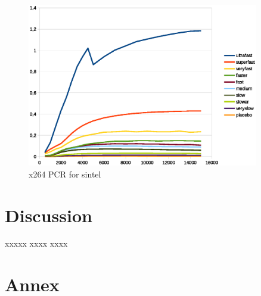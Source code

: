 \documentclass[12pt,twoside]{article}
\begin{document}
\begin{figure}[!h]
	\vspace{-10pt}
	\centering
	\includegraphics[width=0.9\textwidth]{img/x264sintelPCR.eps}
	\caption{x264 PCR for sintel}
	\label{fig:x264sintelPCR}
\end{figure}
\newpage
\section{Discussion}
\label{sec:discussion}
xxxxx xxxx xxxx 
\newpage
\printbibliography
\appendix
\section{Annex}
%
%
\end{document}
